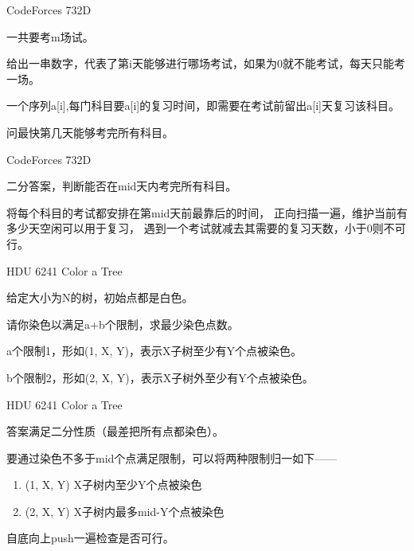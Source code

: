 \documentclass{beamer}
\begin{document}
\begin{frame}{CodeForces 732D}

    一共要考m场试。
    
    给出一串数字，代表了第i天能够进行哪场考试，如果为0就不能考试，每天只能考一场。
    
    一个序列a[i],每门科目要a[i]的复习时间，即需要在考试前留出a[i]天复习该科目。
    
    问最快第几天能够考完所有科目。
    
\end{frame}

\begin{frame}{CodeForces 732D}

    二分答案，判断能否在mid天内考完所有科目。

    将每个科目的考试都安排在第mid天前最靠后的时间，
    正向扫描一遍，维护当前有多少天空闲可以用于复习，
    遇到一个考试就减去其需要的复习天数，小于0则不可行。
    
\end{frame}

\begin{frame}{HDU 6241 Color a Tree}

    给定大小为N的树，初始点都是白色。

    请你染色以满足a+b个限制，求最少染色点数。

    a个限制1，形如(1, X, Y)，表示X子树至少有Y个点被染色。

    b个限制2，形如(2, X, Y)，表示X子树外至少有Y个点被染色。

\end{frame}

\begin{frame}{HDU 6241 Color a Tree}

    答案满足二分性质（最差把所有点都染色）。

    要通过染色不多于mid个点满足限制，可以将两种限制归一如下——

    \begin{enumerate}
        \item (1, X, Y) X子树内至少Y个点被染色
        \item (2, X, Y) X子树内最多mid-Y个点被染色
    \end{enumerate}

    自底向上push一遍检查是否可行。
    
\end{frame}
\end{document}
